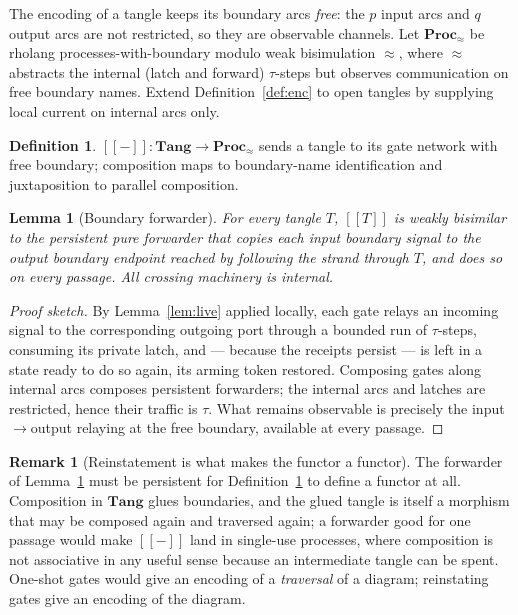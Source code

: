 \documentclass[11pt]{article}
\newtheorem{lemma}{Lemma}
\theoremstyle{definition}
\newtheorem{definition}{Definition}
\newtheorem{remark}{Remark}
\newcommand{\enc}[1]{[\![ #1 ]\!]}
\newcommand{\wbisim}{\approx}
\begin{document}
The encoding of a tangle keeps its boundary arcs \emph{free}: the $p$ input arcs
and $q$ output arcs are not restricted, so they are observable channels. Let
$\mathbf{Proc}_{\wbisim}$ be rholang processes-with-boundary modulo weak
bisimulation $\wbisim$, where $\wbisim$ abstracts the internal (latch and forward)
$\tau$-steps but observes communication on free boundary names. Extend
Definition~\ref{def:enc} to open tangles by supplying local current on internal
arcs only.

\begin{definition}\label{def:enc-functor}
$\enc{-}\colon \mathbf{Tang}\to \mathbf{Proc}_{\wbisim}$ sends a tangle to its gate
network with free boundary; composition maps to boundary-name identification and
juxtaposition to parallel composition.
\end{definition}

\begin{lemma}[Boundary forwarder]\label{lem:fwd}
For every tangle $T$, $\enc{T}$ is weakly bisimilar to the \emph{persistent} pure
forwarder that copies each input boundary signal to the output boundary endpoint
reached by following the strand through $T$, and does so on every passage. All
crossing machinery is internal.
\end{lemma}
\begin{proof}[Proof sketch]
By Lemma~\ref{lem:live} applied locally, each gate relays an incoming signal to
the corresponding outgoing port through a bounded run of $\tau$-steps, consuming
its private latch, and --- because the receipts persist --- is left in a state
ready to do so again, its arming token restored. Composing gates along internal
arcs composes persistent forwarders; the internal arcs and latches are restricted, hence their traffic is
$\tau$. What remains observable is precisely the input$\to$output relaying at the
free boundary, available at every passage.
\end{proof}

\begin{remark}[Reinstatement is what makes the functor a functor]
The forwarder of Lemma~\ref{lem:fwd} must be persistent for
Definition~\ref{def:enc-functor} to define a functor at all. Composition in
$\mathbf{Tang}$ glues boundaries, and the glued tangle is itself a morphism that
may be composed again and traversed again; a forwarder good for one passage would
make $\enc{-}$ land in single-use processes, where composition is not associative
in any useful sense because an intermediate tangle can be spent. One-shot gates
would give an encoding of a \emph{traversal} of a diagram; reinstating gates give
an encoding of the diagram.
\end{remark}
\end{document}
